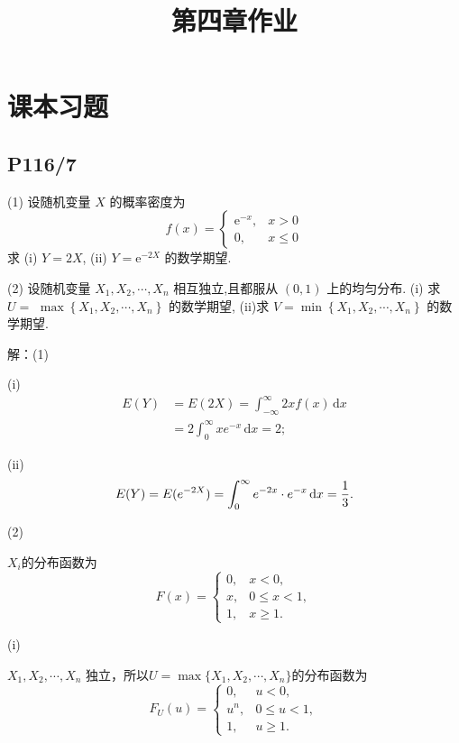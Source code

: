 \documentclass[UTF8,a4paper,10pt]{ctexart}
\title{第四章作业}
\begin{document}
\section{课本习题}
\subsection{P116/7}
 (1) 设随机变量 $X$ 的概率密度为
$$
f(x)= \begin{cases}\mathrm{e}^{-x}, & x>0 \\ 0, & x \leqslant 0\end{cases}
$$
求 (i) $Y=2 X$, (ii) $Y=\mathrm{e}^{-2 X}$ 的数学期望.

(2) 设随机变量 $X_{1}, X_{2}, \cdots, X_{n}$ 相互独立,且都服从 $(0,1)$ 上的均匀分布. (i) 求 $U=$ $\max \left\{X_{1}, X_{2}, \cdots, X_{n}\right\}$ 的数学期望, (ii)求 $V=\min \left\{X_{1}, X_{2}, \cdots, X_{n}\right\}$ 的数学期望.


解：\noindent(1)

(i)
\begin{align}
    E(Y) &= E(2X) = \int_{-\infty}^\infty 2xf(x)\,\text{d}x \nonumber \\
         &= 2 \int_0^\infty x e^{-x}\,\text{d}x = 2;
\end{align}

(ii)
\begin{equation}
    E(Y) = E(e^{-2X}) = \int_0^\infty e^{-2x}\cdot e^{-x}\,\text{d}x = {1\over3}.\\
\end{equation}

\noindent(2)

$X_i$的分布函数为
\begin{equation}
    F(x)= \left\{
    \begin{array}{lr}
    0,& x<0, \\
    x, & 0\leq x<1, \\
    1, & x\geq1 . 
    \end{array}
    \right.
\end{equation}

(i)

$X_1, X_2, \cdots, X_n$ 独立，所以$U=\max\{X_1,X_2,\cdots,X_n\}$的分布函数为
\begin{equation}
    F_U(u)= \left\{
    \begin{array}{lr}
    0,& u<0, \\
    u^n, & 0\leq u<1, \\
    1, & u\geq1 . 
    \end{array}
    \right.
\end{equation}
\end{document}
